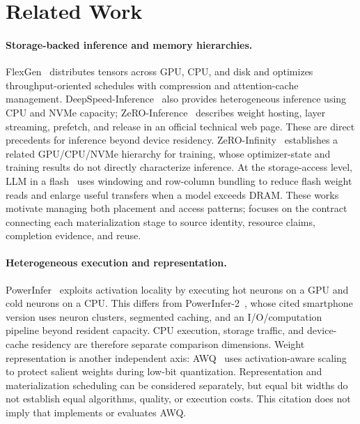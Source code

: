 \section{Related Work}
\label{sec:related}

\paragraph{Storage-backed inference and memory hierarchies.}
FlexGen~\cite{sheng2023flexgen} distributes tensors across GPU, CPU, and disk
and optimizes throughput-oriented schedules with compression and
attention-cache management. DeepSpeed-Inference~\cite{aminabadi2022deepspeed}
also provides heterogeneous inference using CPU and NVMe capacity;
ZeRO-Inference~\cite{deepspeed2022zeroinference} describes weight hosting,
layer streaming, prefetch, and release in an official technical web page.
These are direct precedents for inference beyond device residency.
ZeRO-Infinity~\cite{rajbhandari2021zeroinfinity} establishes a related
GPU/CPU/NVMe hierarchy for training, whose optimizer-state and training
results do not directly characterize inference. At the storage-access level,
LLM in a flash~\cite{alizadeh2024llmflash} uses windowing and row-column
bundling to reduce flash weight reads and enlarge useful transfers when a
model exceeds DRAM. These works motivate managing both placement and access
patterns; \system{} focuses on the contract connecting each materialization
stage to source identity, resource claims, completion evidence, and reuse.

\paragraph{Heterogeneous execution and representation.}
PowerInfer~\cite{song2023powerinfer} exploits activation locality by executing
hot neurons on a GPU and cold neurons on a CPU. This differs from
PowerInfer-2~\cite{xue2024powerinfer2}, whose cited smartphone version uses
neuron clusters, segmented caching, and an I/O/computation pipeline beyond
resident capacity. CPU execution, storage traffic, and device-cache residency
are therefore separate comparison dimensions. Weight representation is
another independent axis: AWQ~\cite{lin2024awq} uses activation-aware scaling
to protect salient weights during low-bit quantization. Representation and
materialization scheduling can be considered separately, but equal bit widths
do not establish equal algorithms, quality, or execution costs. This citation
does not imply that \system{} implements or evaluates AWQ.

